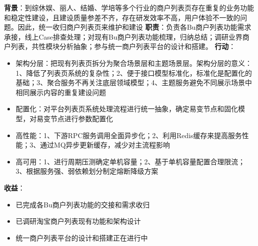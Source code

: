 \documentclass{resume}
\begin{document}
    \begin{onehalfspacing}
        \textbf{背景}：到综休娱、丽人、结婚、学培等多个行业的商户列表页存在重复的业务功能和稳定性建设，且建设质量参差不齐，存在研发效率不高，用户体验不一致的问题。因此，统一收归商户列表页来维护和建设\newline
        \textbf{职责}：负责各Bu商户列表功能需求承接，线上Case排查处理；对现有Bu商户列表功能梳理，归纳总结；调研业界商户列表，共性模块分析抽象；参与统一商户列表平台的设计和搭建。\newline
        \textbf{行动}：
        \begin{itemize}
            \item 架构分层：把现有列表页拆分为聚合场景层和主题场景层。架构分层的意义：1、降低了列表页系统的复杂性；2、便于接口模型标准化，标准化是配置化的基础；3、聚合服务不再关注底层领域模型；4、主题服务避免不同展示场景中相同展示内容的重复建设问题
            \item 配置化：对平台列表页系统处理流程进行统一抽象，确定易变节点和固化模型，对易变节点进行参数配置化
            \item 高性能：1、下游RPC服务调用全面异步化；2、利用Redis缓存来提高服务性能；3、通过MQ异步更新缓存，减少对主流程影响
            \item 高可用：1、进行周期压测确定单机容量；2、基于单机容量配置合理限流；3、根据服务强、弱依赖划分制定熔断降级方案
        \end{itemize}
        \textbf{收益}：
        \begin{itemize}
            \item 已完成各Bu商户列表功能的交接和需求收归
            \item 已调研淘宝商户列表现有功能和架构设计
            \item 统一商户列表平台的设计和搭建正在进行中
        \end{itemize}
    \end{onehalfspacing}
    \blankline{ }
\end{document}
